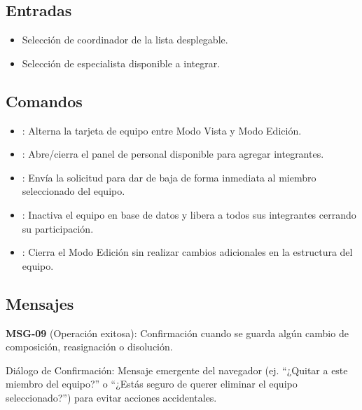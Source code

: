 \subsection{Entradas}
	\begin{itemize}
		\item Selección de coordinador de la lista desplegable.
		\item Selección de especialista disponible a integrar.
	\end{itemize}

\subsection{Comandos}
	\begin{itemize}
		\item {}: Alterna la tarjeta de equipo entre Modo Vista y Modo Edición.
		\item \IUbutton{+}: Abre/cierra el panel de personal disponible para agregar integrantes.
		\item {}: Envía la solicitud para dar de baja de forma inmediata al miembro seleccionado del equipo.
		\item {}: Inactiva el equipo en base de datos y libera a todos sus integrantes cerrando su participación.
		\item {}: Cierra el Modo Edición sin realizar cambios adicionales en la estructura del equipo.
	\end{itemize}

\subsection{Mensajes}
	\begin{Citemize}
		\item {\bf MSG-09} (Operación exitosa): Confirmación cuando se guarda algún cambio de composición, reasignación o disolución.
		\item Diálogo de Confirmación: Mensaje emergente del navegador (ej. ``¿Quitar a este miembro del equipo?'' o ``¿Estás seguro de querer eliminar el equipo seleccionado?'') para evitar acciones accidentales.
	\end{Citemize}
